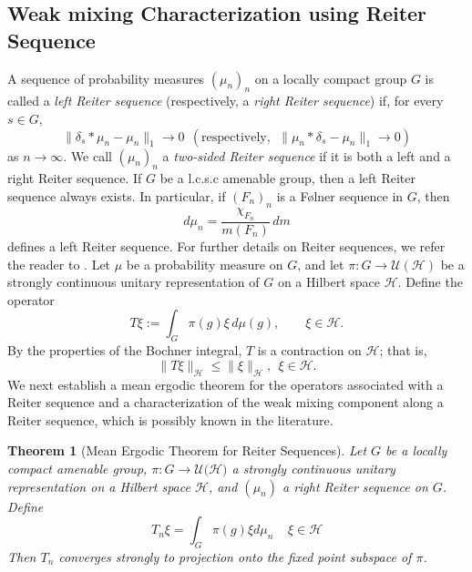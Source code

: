 \documentclass[11pt]{amsart}
\newtheorem{thm}{Theorem}[section]
\theoremstyle{definition}
\theoremstyle{myremark}
\numberwithin{equation}{section}
\begin{document}
\subsection{ Weak mixing Characterization using Reiter Sequence}

A sequence of probability measures $(\mu_n)_n$ on a locally compact group
$G$ is called a \emph{left Reiter sequence} (respectively, a
\emph{right Reiter sequence}) if, for every $s\in G$,
\[
\|\delta_s * \mu_n-\mu_n\|_1 \longrightarrow 0
~~
\left(\text{respectively, }\;
\|\mu_n * \delta_s-\mu_n\|_1 \longrightarrow 0\right)
\]
as $n\to\infty$. We call $(\mu_n)_n$ a \emph{two-sided Reiter sequence}
if it is both a left and a right Reiter sequence.
If $G$ be a l.c.s.c amenable group, then a left
Reiter sequence always exists. In particular, if $(F_n)_n$ is a Følner
sequence in $G$, then
\[
d\mu_n=\frac{\chi_{F_n}}{m(F_n)}\,dm
\]
defines a left Reiter sequence. For further details on Reiter sequences,
we refer the reader to \cite{H_Reiter2000}.
Let $\mu$ be a probability measure on $G$, and let $ \pi:G\longrightarrow\mathcal{U}(\mathcal{H})$
be a strongly continuous unitary representation of $G$ on a Hilbert
space $\mathcal{H}$. Define the operator
\[
T\xi:=\int_G \pi(g)\xi\,d\mu(g),
\qquad \xi\in\mathcal{H}.
\]
By the properties of the Bochner integral, $T$ is a contraction on
$\mathcal{H}$; that is,
\[
\|T\xi\|_{\mathcal{H}}\leq \|\xi\|_{\mathcal{H}},
~~\xi\in\mathcal{H}.
\]
We next establish a mean ergodic theorem for the operators associated
with a Reiter sequence and a characterization of the weak mixing component along a Reiter sequence, which is possibly known in the literature. 
\begin{thm}[Mean Ergodic Theorem for Reiter Sequences]\label{METReiter}
     Let $G$ be a locally compact amenable group, $\pi:G\to \mathcal{U(H})$ a strongly continuous unitary representation on a Hilbert space $\mathcal{H}$, and
$(\mu_n)$ a right Reiter sequence on $G$. Define
$$T_n\xi=\int_G\pi(g)\xi d\mu_n ~~~~~\xi\in \mathcal{H}$$
Then $T_n$ converges strongly to projection onto the fixed point subspace of $\pi$.
 \end{thm}
\end{document}

